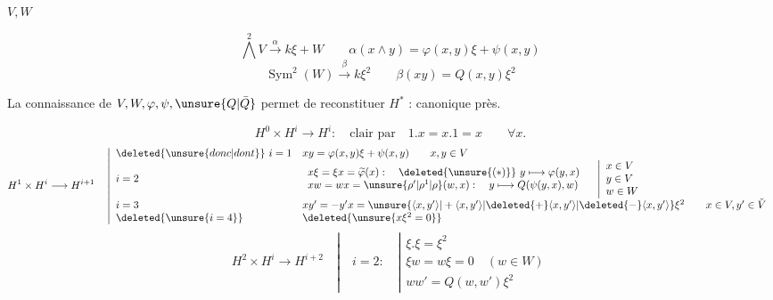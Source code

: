 \begin{flushright}\end{flushright}

$V,W$

\[
\bigwedge^2 V\xrightarrow{\alpha}k\xi+W
\qquad \alpha(x\wedge y)=\varphi(x,y)\xi+\psi(x,y)
\]
\[
\operatorname{Sym}^2(W)\xrightarrow{\beta}k\xi^2
\qquad \beta(xy)=Q(x,y)\xi^2
\]

La connaissance de $V,W,\varphi,\psi,\unsure{Q|\bar Q}$ permet de reconstituer $H^*$ :
 canonique près.

\[
H^0\times H^i\longrightarrow H^i:\quad\text{clair par}\quad
1.x=x.1=x\qquad\forall x.
\]
\[
H^1\times H^i\longrightarrow H^{i+1}\quad
\left|\begin{array}{ll}
\deleted{\unsure{donc|dont}}\ i=1&xy=\varphi(x,y)\xi+\psi(x,y)\qquad x,y\in V\\
i=2&\begin{array}{l}
x\xi=\xi x=\widetilde\varphi(x):\quad\deleted{\unsure{(*)}}\ y\longmapsto\varphi(y,x)\\
xw=wx=\unsure{\rho'|\rho^1|\rho}(w,x):\quad y\longmapsto Q(\psi(y,x),w)
\end{array}\quad\left|\begin{array}{l}x\in V\\y\in V\\w\in W\end{array}\right.\\
i=3&xy'=-y'x=\unsure{\langle x,y'\rangle|+\langle x,y'\rangle|\deleted{+}\langle x,y'\rangle|\deleted{-}\langle x,y'\rangle}\xi^2\qquad x\in V,y'\in\check V\\
\deleted{\unsure{i=4}}&\deleted{\unsure{x\xi^2=0}}
\end{array}\right.
\]
\[
H^2\times H^i\longrightarrow H^{i+2}\quad
\left|\quad i=2:\quad\left|\begin{array}{l}
\xi.\xi=\xi^2\\
\xi w=w\xi=0\quad(w\in W)\\
ww'=Q(w,w')\xi^2
\end{array}\right.\right.
\]

